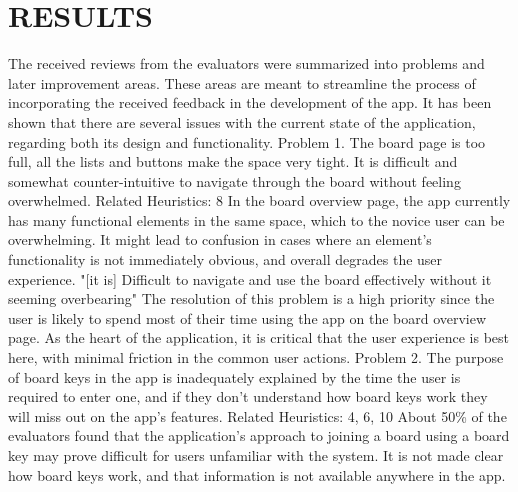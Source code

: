 \section{RESULTS}
\indent The received reviews from the evaluators were summarized into problems and later improvement areas. These areas are meant to streamline the process of incorporating the received feedback in the development of the app. It has been shown that there are several issues with the current state of the application, regarding both its design and functionality.
\newline
\newline
Problem 1.
\newline
The board page is too full, all the lists and buttons make the space very tight. It is difficult and somewhat counter-intuitive to navigate through the board without feeling overwhelmed.
\newline
Related Heuristics: 8
\newline
\indent In the board overview page, the app currently has many functional elements in the same space, which to the novice user can be overwhelming. It might lead to confusion in cases where an element's functionality is not immediately obvious, and overall degrades the user experience.
\newline
"[it is] Difficult to navigate and use the board effectively without it seeming overbearing"\cite{team-review}
\newline
\indent The resolution of this problem is a high priority since the user is likely to spend most of their time using the app on the board overview page. As the heart of the application, it is critical that the user experience is best here, with minimal friction in the common user actions.
\newline
\newline
Problem 2.
\newline
The purpose of board keys in the app is inadequately explained by the time the user is required to enter one, and if they don't understand how board keys work they will miss out on the app's features.
\newline
Related Heuristics: 4, 6, 10
\newline
\indent About 50\% of the evaluators found that the application’s approach to joining a board using a board key may prove difficult for users unfamiliar with the system. It is not made clear how board keys work, and that information is not available anywhere in the app. 
\newline
